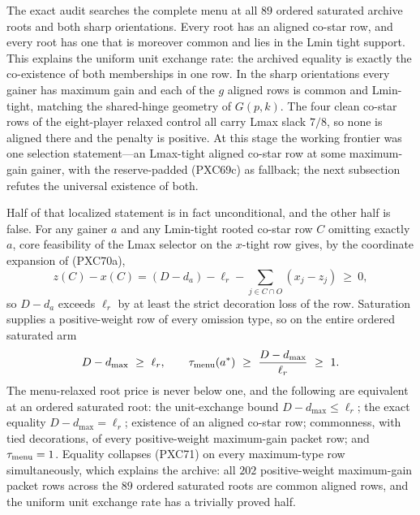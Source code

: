 \documentclass[11pt]{article}
\begin{document}
The exact audit searches the complete menu at all $89$ ordered saturated
archive roots and both sharp orientations.  Every root has an aligned
co-star row, and every root has one that is moreover common and lies in
the Lmin tight support.  This explains the uniform unit exchange rate: the
archived equality is exactly the co-existence of both memberships in one
row.  In the sharp orientations every gainer has maximum gain and each of
the $g$ aligned rows is common and Lmin-tight, matching the shared-hinge
geometry of $G(p,k)$.  The four clean co-star rows of the eight-player
relaxed control all carry Lmax slack $7/8$, so none is aligned there and
the penalty is positive.  At this stage the working frontier was one
selection statement---an Lmax-tight aligned co-star row at some
maximum-gain gainer, with the reserve-padded (PXC69c) as fallback; the
next subsection refutes the universal existence of both.

Half of that localized statement is in fact unconditional, and the other
half is false.  For any gainer $a$ and any Lmin-tight rooted co-star row
$C$ omitting exactly $a$, core feasibility of the Lmax selector on the
$x$-tight row gives, by the coordinate expansion of (PXC70a),
\[
 \boxed{\qquad
 z(C)-x(C)=(D-d_a)-\ell_r-
 \sum_{j\in C\cap O}(x_j-z_j)\ \ge\ 0,
 \qquad}                                             \tag{PXC71}
\]
so $D-d_a$ exceeds $\ell_r$ by at least the strict decoration loss of the
row.  Saturation supplies a positive-weight row of every omission type,
so on the entire ordered saturated arm
\[
 D-d_{\max}\ \ge\ \ell_r,\qquad
 \tau_{\rm menu}(a^*)\ \ge\ \frac{D-d_{\max}}{\ell_r}\ \ge\ 1.
\]
The menu-relaxed root price is never below one, and the following are
equivalent at an ordered saturated root: the unit-exchange bound
$D-d_{\max}\le\ell_r$; the exact equality $D-d_{\max}=\ell_r$; existence
of an aligned co-star row; commonness, with tied decorations, of every
positive-weight maximum-gain packet row; and $\tau_{\rm menu}=1$.
Equality collapses (PXC71) on every maximum-type row simultaneously,
which explains the archive: all $202$ positive-weight maximum-gain packet
rows across the $89$ ordered saturated roots are common aligned rows, and
the uniform unit exchange rate has a trivially proved half.
\end{document}
